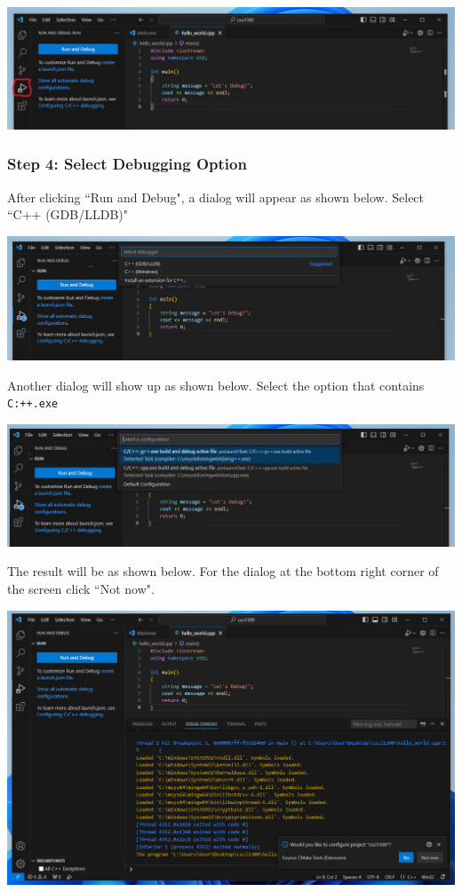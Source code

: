 \includegraphics[width=\textwidth]{images/windowsDebuggerSetup/debugger_windows_4.png}

\subsubsection{Step 4: Select Debugging Option}

After clicking ``Run and Debug", a dialog will appear as shown below.
Select ``C++ (GDB/LLDB)" 

\includegraphics[width=\textwidth]{images/windowsDebuggerSetup/debugger_windows_5.png}

Another dialog will show up as shown below.
Select the option that contains \texttt{C:\bin\g++.exe}

\includegraphics[width=\textwidth]{images/windowsDebuggerSetup/debugger_windows_6.png}

The result will be as shown below. For the dialog at the bottom right corner of the screen click ``Not now". 

\includegraphics[width=\textwidth]{images/windowsDebuggerSetup/debugger_windows_7.png}

